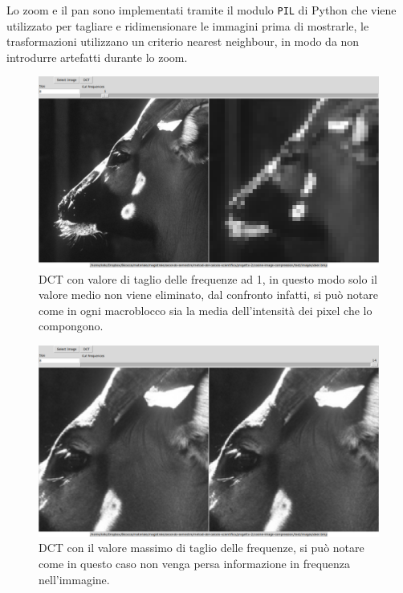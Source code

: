 \documentclass[a4paper, 12pt]{article}
\begin{document}
Lo zoom e il pan sono implementati tramite il modulo \texttt{PIL} di Python che
viene utilizzato per tagliare e ridimensionare le immagini prima di mostrarle, 
le trasformazioni utilizzano un criterio nearest neighbour, in modo da non 
introdurre artefatti durante lo zoom.


\begin{figure}[h]
  \includegraphics[width=\textwidth]{./imgs/deer-1.png}
  \caption{DCT con valore di taglio delle frequenze ad 1, in questo modo solo
    il valore medio non viene eliminato, dal confronto infatti, si può notare
    come in ogni macroblocco sia la media dell'intensità dei pixel che lo
    compongono.}
  \label{fig:deer-1}
\end{figure}


\begin{figure}[h]
  \includegraphics[width=\textwidth]{./imgs/deer-full.png}
  \caption{DCT con il valore massimo di taglio delle frequenze, si può notare come in questo caso non venga persa informazione in frequenza nell'immagine.}
  \label{fig:deer-full}
\end{figure}
\end{document}
